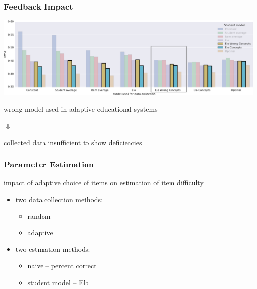 \documentclass[bigger]{beamer}
\begin{document}
\begin{frame}
  \frametitle{Feedback Impact}
  \begin{center}
    \includegraphics[width=\linewidth]{rmse_complex2}
  \end{center}

  \bigskip

  \begin{center}
    wrong model used in adaptive educational systems 
    
    $\Downarrow$

    collected data insufficient to show deficiencies 
  \end{center}
\end{frame}

\begin{frame}
  \frametitle{Parameter Estimation}

  impact of adaptive choice of items on estimation of item difficulty

  \begin{itemize}
  \item two data collection methods:
    \begin{itemize}
    \item random
    \item adaptive
    \end{itemize}
  \item two estimation methods:
    \begin{itemize}
    \item naive -- percent correct
    \item student model -- Elo 
    \end{itemize}
  \end{itemize}
\end{frame}
\end{document}
